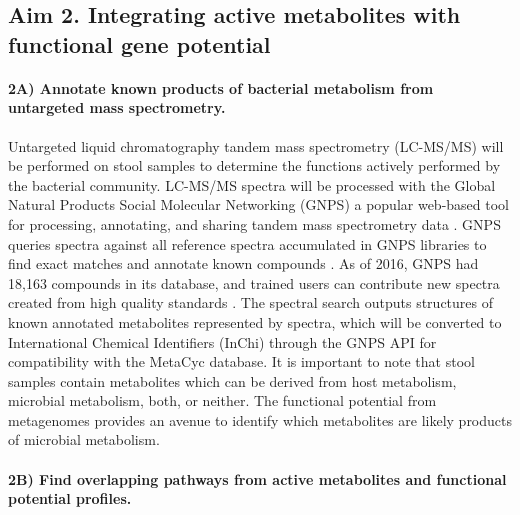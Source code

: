 \documentclass[11pt]{article}
\begin{document}
\subsection*{Aim 2. Integrating active metabolites with functional gene potential}

\paragraph{2A) Annotate known products of bacterial metabolism from untargeted mass spectrometry.}

Untargeted liquid chromatography tandem mass spectrometry (LC-MS/MS) will be performed on stool samples to determine the functions actively performed by the bacterial community.
LC-MS/MS spectra will be processed with the Global Natural Products Social Molecular Networking (GNPS) a popular web-based tool for processing, annotating, and sharing tandem mass spectrometry data \cite{wang_sharing_2016}.
GNPS queries spectra against all reference spectra accumulated in GNPS libraries to find exact matches and annotate known compounds \cite{aron_reproducible_2020}.
As of 2016, GNPS had 18,163 compounds in its database, and trained users can contribute new spectra created from high quality standards \cite{vargas_protocol_2019}.
The spectral search outputs structures of known annotated metabolites represented by spectra, which will be converted to International Chemical Identifiers (InChi) through the GNPS API for compatibility with the MetaCyc database.
It is important to note that stool samples contain metabolites which can be derived from host metabolism, microbial metabolism, both, or neither.
The functional potential from metagenomes provides an avenue to identify which metabolites are likely products of microbial metabolism.

\paragraph{2B) Find overlapping pathways from active metabolites and functional potential profiles.}
\end{document}
